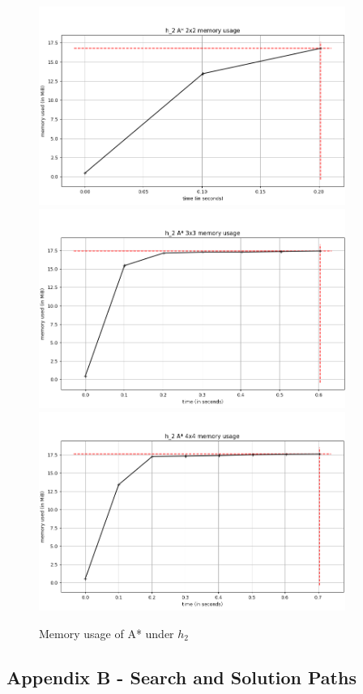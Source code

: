 \documentclass[runningheads]{llncs}
\begin{document}
\begin{figure}
    \begin{center}
        \includegraphics[width=10cm]{images/a_star_h2_2x2.png}
        \includegraphics[width=10cm]{images/a_star_h2_3x3.png}
        \includegraphics[width=10cm]{images/a_star_h2_4x4.png}
        \caption{Memory usage of A* under $h_2$} \label{fig3}
    \end{center}
\end{figure}
    
\newpage

\subsection{Appendix B - Search and Solution Paths}
\end{document}
